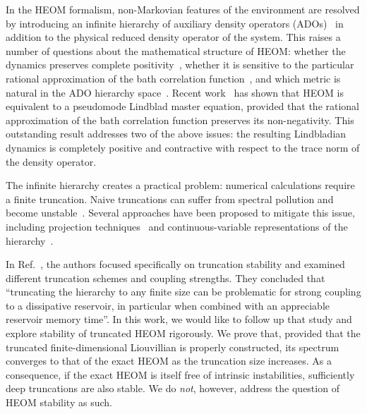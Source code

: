 \documentclass{SciPost}
\begin{document}
In the HEOM formalism, non-Markovian features of the environment are resolved by introducing an infinite hierarchy of auxiliary density operators (ADOs)~\cite{Tanimura2020, Xu2023, Xu2026a} in addition to the physical reduced density operator of the system. This raises a number of questions about the mathematical structure of HEOM: whether the dynamics preserves complete positivity~\cite{Witt2017}, whether it is sensitive to the particular rational approximation of the bath correlation function~\cite{Xu2022, Huang2024}, and which metric is natural in the ADO hierarchy space~\cite{Chen2024a}. Recent work~\cite{Mueller2026} has shown that HEOM is equivalent to a pseudomode Lindblad master equation, provided that the rational approximation of the bath correlation function preserves its non-negativity. This outstanding result addresses two of the above issues: the resulting Lindbladian dynamics is completely positive and contractive with respect to the trace norm of the density operator.

The infinite hierarchy creates a practical problem: numerical calculations require a finite truncation. Naive truncations can suffer from spectral pollution and become unstable~\cite{Shi2018, Dunn2019, Yan2020a, Li2022, Krug2023}. Several approaches have been proposed to mitigate this issue, including projection techniques~\cite{Dunn2019} and continuous-variable representations of the hierarchy~\cite{Yan2020a, Li2022, Chen2024a}.

In Ref.~\cite{Krug2023}, the authors focused specifically on truncation stability and examined different truncation schemes and coupling strengths. They concluded that ``truncating the hierarchy to any finite size can be problematic for strong coupling to a dissipative reservoir, in particular when combined with an appreciable reservoir memory time''. In this work, we would like to follow up that study and explore stability of truncated HEOM rigorously. We prove that, provided that the truncated finite-dimensional Liouvillian is properly constructed, its spectrum converges to that of the exact HEOM as the truncation size increases. As a consequence, if the exact HEOM is itself free of intrinsic instabilities, sufficiently deep truncations are also stable. We do \emph{not}, however, address the question of HEOM stability as such.
\end{document}
